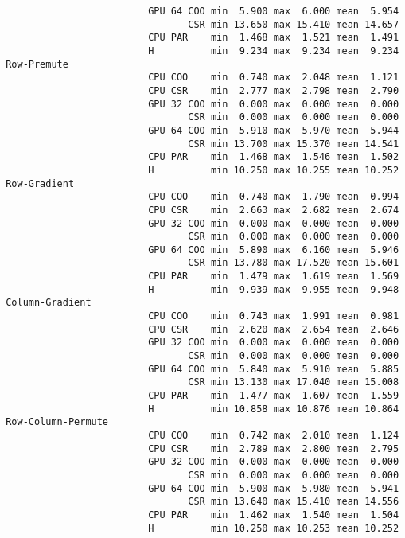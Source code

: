 \begin{verbatim}
                          GPU 64 COO min  5.900 max  6.000 mean  5.954
                                 CSR min 13.650 max 15.410 mean 14.657
                          CPU PAR    min  1.468 max  1.521 mean  1.491
                          H          min  9.234 max  9.234 mean  9.234
 Row-Premute
                          CPU COO    min  0.740 max  2.048 mean  1.121
                          CPU CSR    min  2.777 max  2.798 mean  2.790
                          GPU 32 COO min  0.000 max  0.000 mean  0.000
                                 CSR min  0.000 max  0.000 mean  0.000
                          GPU 64 COO min  5.910 max  5.970 mean  5.944
                                 CSR min 13.700 max 15.370 mean 14.541
                          CPU PAR    min  1.468 max  1.546 mean  1.502
                          H          min 10.250 max 10.255 mean 10.252
 Row-Gradient
                          CPU COO    min  0.740 max  1.790 mean  0.994
                          CPU CSR    min  2.663 max  2.682 mean  2.674
                          GPU 32 COO min  0.000 max  0.000 mean  0.000
                                 CSR min  0.000 max  0.000 mean  0.000
                          GPU 64 COO min  5.890 max  6.160 mean  5.946
                                 CSR min 13.780 max 17.520 mean 15.601
                          CPU PAR    min  1.479 max  1.619 mean  1.569
                          H          min  9.939 max  9.955 mean  9.948
 Column-Gradient
                          CPU COO    min  0.743 max  1.991 mean  0.981
                          CPU CSR    min  2.620 max  2.654 mean  2.646
                          GPU 32 COO min  0.000 max  0.000 mean  0.000
                                 CSR min  0.000 max  0.000 mean  0.000
                          GPU 64 COO min  5.840 max  5.910 mean  5.885
                                 CSR min 13.130 max 17.040 mean 15.008
                          CPU PAR    min  1.477 max  1.607 mean  1.559
                          H          min 10.858 max 10.876 mean 10.864
 Row-Column-Permute
                          CPU COO    min  0.742 max  2.010 mean  1.124
                          CPU CSR    min  2.789 max  2.800 mean  2.795
                          GPU 32 COO min  0.000 max  0.000 mean  0.000
                                 CSR min  0.000 max  0.000 mean  0.000
                          GPU 64 COO min  5.900 max  5.980 mean  5.941
                                 CSR min 13.640 max 15.410 mean 14.556
                          CPU PAR    min  1.462 max  1.540 mean  1.504
                          H          min 10.250 max 10.253 mean 10.252

\end{verbatim}
